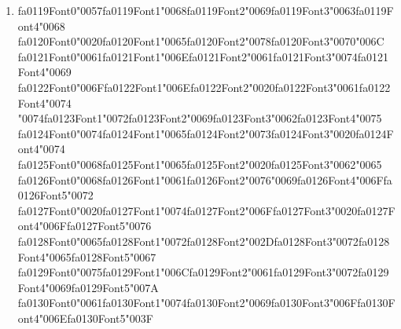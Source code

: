 \documentclass[12pt]{article}
\begin{document}
\begin{enumerate}[label=Q\arabic*.]
 \begin{enumerate}[label=(\Alph*)]
     \item Bag-of-Words representation assumes term independence
     \item IDF overweights rare tokens
     \item Document length normalization distorts similarity
     \item Cosine similarity ignores magnitude differences
 \end{enumerate}
 
 \item {\csname fa0119Font0\endcsname\char"0057}{\csname fa0119Font1\endcsname\char"0068}{\csname fa0119Font2\endcsname\char"0069}{\csname fa0119Font3\endcsname\char"0063}{\csname fa0119Font4\endcsname\char"0068} {\csname fa0120Font0\endcsname\char"0020}{\csname fa0120Font1\endcsname\char"0065}{\csname fa0120Font2\endcsname\char"0078}{\csname fa0120Font3\endcsname\char"0070}{\char"006C} {\csname fa0121Font0\endcsname\char"0061}{\csname fa0121Font1\endcsname\char"006E}{\csname fa0121Font2\endcsname\char"0061}{\csname fa0121Font3\endcsname\char"0074}{\csname fa0121Font4\endcsname\char"0069} {\csname fa0122Font0\endcsname\char"006F}{\csname fa0122Font1\endcsname\char"006E}{\csname fa0122Font2\endcsname\char"0020}{\csname fa0122Font3\endcsname\char"0061}{\csname fa0122Font4\endcsname\char"0074} {\char"0074}{\csname fa0123Font1\endcsname\char"0072}{\csname fa0123Font2\endcsname\char"0069}{\csname fa0123Font3\endcsname\char"0062}{\csname fa0123Font4\endcsname\char"0075} {\csname fa0124Font0\endcsname\char"0074}{\csname fa0124Font1\endcsname\char"0065}{\csname fa0124Font2\endcsname\char"0073}{\csname fa0124Font3\endcsname\char"0020}{\csname fa0124Font4\endcsname\char"0074} {\csname fa0125Font0\endcsname\char"0068}{\csname fa0125Font1\endcsname\char"0065}{\csname fa0125Font2\endcsname\char"0020}{\csname fa0125Font3\endcsname\char"0062}{\char"0065} {\csname fa0126Font0\endcsname\char"0068}{\csname fa0126Font1\endcsname\char"0061}{\csname fa0126Font2\endcsname\char"0076}{\char"0069}{\csname fa0126Font4\endcsname\char"006F}{\csname fa0126Font5\endcsname\char"0072} {\csname fa0127Font0\endcsname\char"0020}{\csname fa0127Font1\endcsname\char"0074}{\csname fa0127Font2\endcsname\char"006F}{\csname fa0127Font3\endcsname\char"0020}{\csname fa0127Font4\endcsname\char"006F}{\csname fa0127Font5\endcsname\char"0076} {\csname fa0128Font0\endcsname\char"0065}{\csname fa0128Font1\endcsname\char"0072}{\csname fa0128Font2\endcsname\char"002D}{\csname fa0128Font3\endcsname\char"0072}{\csname fa0128Font4\endcsname\char"0065}{\csname fa0128Font5\endcsname\char"0067} {\csname fa0129Font0\endcsname\char"0075}{\csname fa0129Font1\endcsname\char"006C}{\csname fa0129Font2\endcsname\char"0061}{\csname fa0129Font3\endcsname\char"0072}{\csname fa0129Font4\endcsname\char"0069}{\csname fa0129Font5\endcsname\char"007A} {\csname fa0130Font0\endcsname\char"0061}{\csname fa0130Font1\endcsname\char"0074}{\csname fa0130Font2\endcsname\char"0069}{\csname fa0130Font3\endcsname\char"006F}{\csname fa0130Font4\endcsname\char"006E}{\csname fa0130Font5\endcsname\char"003F}

\end{enumerate}
\end{document}
